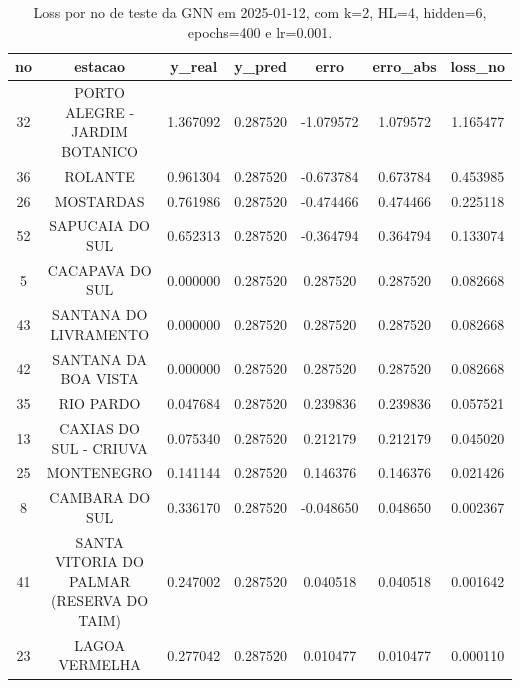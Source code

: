\begin{table}[h]
\centering
\caption{Loss por no de teste da GNN em 2025-01-12, com k=2, HL=4, hidden=6, epochs=400 e lr=0.001.}
\label{tab:gnn_loss_k2_hl4_h6_e400_d20250112}
\begin{tabular}{ccccccc}
\toprule
no & estacao & y\_real & y\_pred & erro & erro\_abs & loss\_no \\
\midrule
32 & PORTO ALEGRE - JARDIM BOTANICO & 1.367092 & 0.287520 & -1.079572 & 1.079572 & 1.165477 \\
36 & ROLANTE & 0.961304 & 0.287520 & -0.673784 & 0.673784 & 0.453985 \\
26 & MOSTARDAS & 0.761986 & 0.287520 & -0.474466 & 0.474466 & 0.225118 \\
52 & SAPUCAIA DO SUL & 0.652313 & 0.287520 & -0.364794 & 0.364794 & 0.133074 \\
5 & CACAPAVA DO SUL & 0.000000 & 0.287520 & 0.287520 & 0.287520 & 0.082668 \\
43 & SANTANA DO LIVRAMENTO & 0.000000 & 0.287520 & 0.287520 & 0.287520 & 0.082668 \\
42 & SANTANA DA BOA VISTA & 0.000000 & 0.287520 & 0.287520 & 0.287520 & 0.082668 \\
35 & RIO PARDO & 0.047684 & 0.287520 & 0.239836 & 0.239836 & 0.057521 \\
13 & CAXIAS DO SUL - CRIUVA & 0.075340 & 0.287520 & 0.212179 & 0.212179 & 0.045020 \\
25 & MONTENEGRO & 0.141144 & 0.287520 & 0.146376 & 0.146376 & 0.021426 \\
8 & CAMBARA DO SUL & 0.336170 & 0.287520 & -0.048650 & 0.048650 & 0.002367 \\
41 & SANTA VITORIA DO PALMAR (RESERVA DO TAIM) & 0.247002 & 0.287520 & 0.040518 & 0.040518 & 0.001642 \\
23 & LAGOA VERMELHA & 0.277042 & 0.287520 & 0.010477 & 0.010477 & 0.000110 \\
\bottomrule
\end{tabular}
\end{table}
